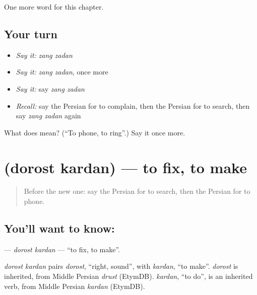 \begin{grammarlens}[title={What you've built}]
One more word for this chapter.
\end{grammarlens}

\subsection*{Your turn}
\begin{itemize}
\raggedright
  \item \emph{Say it:} \emph{zang zadan}
  \item \emph{Say it:} \emph{zang zadan}, once more
  \item \emph{Say it:} say \emph{zang zadan}
  \item \emph{Recall:} say the Persian for to complain, then the Persian for to search, then say \emph{zang zadan} again
\end{itemize}

\begin{tcolorbox}[breakable,colback=teal!4,colframe=teal!35!black,title={Before you move on}]
What does   mean? (\textquotedblleft{}To phone, to ring\textquotedblright{}.) Say it once more.
\end{tcolorbox}
\section[\texorpdfstring{\fa{درست} \fa{کردن} (dorost kardan)}{درست کردن (dorost kardan)}]{  (dorost kardan) — to fix, to make}

\label{lesson:FA-C258-dorost-kardan}



\begin{quote}
Before the new one: say the Persian for to search, then the Persian for to phone.
\end{quote}

\subsection*{You'll want to know:  }
\textbf{ } — \emph{dorost kardan} — \textquotedblleft{}to fix, to make\textquotedblright{}.

\begin{cousinweb}
\emph{dorost kardan} pairs \emph{dorost}, \textquotedblleft{}right, sound\textquotedblright{}, with \emph{kardan}, \textquotedblleft{}to make\textquotedblright{}. \emph{dorost} is inherited, from Middle Persian \emph{drust} (EtymDB). \emph{kardan}, \textquotedblleft{}to do\textquotedblright{}, is an inherited verb, from Middle Persian \emph{kardan} (EtymDB).
\end{cousinweb}


